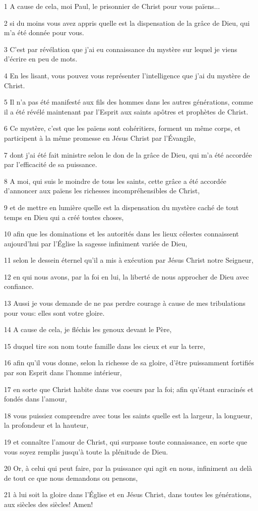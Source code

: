 \par 1 A cause de cela, moi Paul, le prisonnier de Christ pour vous païens...
\par 2 si du moins vous avez appris quelle est la dispensation de la grâce de Dieu, qui m'a été donnée pour vous.
\par 3 C'est par révélation que j'ai eu connaissance du mystère sur lequel je viens d'écrire en peu de mots.
\par 4 En les lisant, vous pouvez vous représenter l'intelligence que j'ai du mystère de Christ.
\par 5 Il n'a pas été manifesté aux fils des hommes dans les autres générations, comme il a été révélé maintenant par l'Esprit aux saints apôtres et prophètes de Christ.
\par 6 Ce mystère, c'est que les païens sont cohéritiers, forment un même corps, et participent à la même promesse en Jésus Christ par l'Évangile,
\par 7 dont j'ai été fait ministre selon le don de la grâce de Dieu, qui m'a été accordée par l'efficacité de sa puissance.
\par 8 A moi, qui suis le moindre de tous les saints, cette grâce a été accordée d'annoncer aux païens les richesses incompréhensibles de Christ,
\par 9 et de mettre en lumière quelle est la dispensation du mystère caché de tout temps en Dieu qui a créé toutes choses,
\par 10 afin que les dominations et les autorités dans les lieux célestes connaissent aujourd'hui par l'Église la sagesse infiniment variée de Dieu,
\par 11 selon le dessein éternel qu'il a mis à exécution par Jésus Christ notre Seigneur,
\par 12 en qui nous avons, par la foi en lui, la liberté de nous approcher de Dieu avec confiance.
\par 13 Aussi je vous demande de ne pas perdre courage à cause de mes tribulations pour vous: elles sont votre gloire.
\par 14 A cause de cela, je fléchis les genoux devant le Père,
\par 15 duquel tire son nom toute famille dans les cieux et sur la terre,
\par 16 afin qu'il vous donne, selon la richesse de sa gloire, d'être puissamment fortifiés par son Esprit dans l'homme intérieur,
\par 17 en sorte que Christ habite dans vos coeurs par la foi; afin qu'étant enracinés et fondés dans l'amour,
\par 18 vous puissiez comprendre avec tous les saints quelle est la largeur, la longueur, la profondeur et la hauteur,
\par 19 et connaître l'amour de Christ, qui surpasse toute connaissance, en sorte que vous soyez remplis jusqu'à toute la plénitude de Dieu.
\par 20 Or, à celui qui peut faire, par la puissance qui agit en nous, infiniment au delà de tout ce que nous demandons ou pensons,
\par 21 à lui soit la gloire dans l'Église et en Jésus Christ, dans toutes les générations, aux siècles des siècles! Amen!

